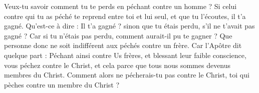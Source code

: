 Veux-tu savoir comment tu te perds en péchant contre un homme ? Si celui contre qui tu as péché te reprend entre toi et lui seul, et que tu l’écoutes, il t’a gagné. Qu’est-ce à dire : Il t’a gagné ? sinon que tu étais perdu, s’il ne t’avait pas gagné ? Car si tu n’étais pas perdu, comment aurait-il pu te gagner ? Que personne donc ne soit indifférent aux péchés contre un frère. Car l’Apôtre dit quelque part : Péchant ainsi contre Us frères, et blessant leur faible conscience, vous péchez contre le Christ, et cela parce que tous nous sommes devenus membres du Christ. Comment alors ne pécherais-tu pas contre le Christ, toi qui pèches contre un membre du Christ ?
